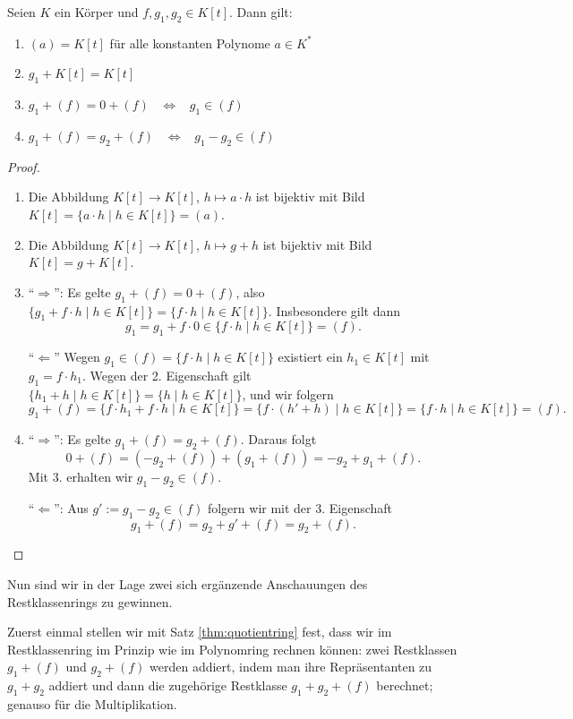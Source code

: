 \begin{lemma}\label{lem:propquotring}
 Seien $K$ ein Körper und $f, g_1, g_2 \in K[t]$. Dann gilt:
 \begin{enumerate}
  \item $(a) = K[t]$ für alle konstanten Polynome $a \in K^*$
  \item $g_1 + K[t] = K[t]$
  \item $g_1 + (f) = 0 + (f) \;\;\; \Leftrightarrow \;\;\; g_1 \in (f)$
  \item $g_1 + (f) = g_2 + (f) \;\;\; \Leftrightarrow \;\;\; g_1 - g_2 \in (f)$
 \end{enumerate}
\end{lemma}
\begin{proof}
 \begin{enumerate}
  \item Die Abbildung $K[t] → K[t]$, $h ↦ a \cdot h$ ist bijektiv mit Bild $K[t] = \{a \cdot h\mid h \in K[t]\} = (a)$.
  \item Die Abbildung $K[t] → K[t]$, $h ↦ g + h$ ist bijektiv mit Bild $K[t] = g + K[t]$.
  \item \enquote{$\Rightarrow$}: Es gelte $g_1 + (f) = 0 + (f)$, also $\{g_1 + f⋅ h\mid h \in K[t]\} = \{f \cdot h\mid h \in K[t]\}$. Insbesondere gilt dann 
  \[g_1 = g_1 + f \cdot 0 \in \{f \cdot h\mid h \in K[t]\} = (f).\]
  
  \enquote{$\Leftarrow$} Wegen $g_1 \in (f) = \{f \cdot h\mid h \in K[t]\} $ existiert ein $h_1 \in K[t]$ mit $g_1 = f \cdot h_1$. Wegen der 2. Eigenschaft gilt $\{h_1 + h \mid h \in K[t]\} = \{h\mid h \in K[t]\}$, und wir folgern
  \[g_1 + (f) = \{f \cdot h_1 + f⋅ h\mid h \in K[t]\} = \{f \cdot (h' + h)\mid h \in K[t]\} = \{f \cdot h\mid h \in K[t]\} = (f).\]
  \item \enquote{$\Rightarrow$}: Es gelte $g_1 + (f) = g_2 + (f)$. Daraus folgt
  \[0 + (f) = (-g_2 + (f)) + (g_1 + (f)) = -g_2 + g_1 + (f).\]
  Mit 3. erhalten wir $g_1-g_2 \in (f)$.
  
  \enquote{$\Leftarrow$}: Aus $g' := g_1 - g_2 \in (f)$ folgern wir mit der 3. Eigenschaft
 \[g_1 + (f) = g_2 + g' + (f) = g_2 + (f).\]
  
 \end{enumerate}
\end{proof}


Nun sind wir in der Lage zwei sich ergänzende Anschauungen des Restklassenrings zu gewinnen.

Zuerst einmal stellen wir mit Satz \ref{thm:quotientring} fest, dass wir im Restklassenring im Prinzip wie im Polynomring rechnen können: zwei Restklassen $g_1 + (f)$ und $g_2 + (f)$ werden addiert, indem man ihre Repräsentanten zu $g_1+g_2$ addiert und dann die zugehörige Restklasse $g_1 + g_2 + (f)$ berechnet; genauso für die Multiplikation.

